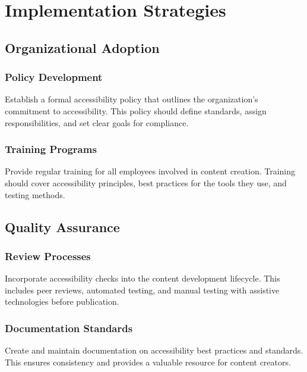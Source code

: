 \section{Implementation Strategies}\label{ch15:sec:implementation-strategies}

\subsection{Organizational Adoption}\label{ch15:ssec:org-adoption}

\subsubsection{Policy Development}\label{ch15:sssec:policy-dev}
Establish a formal accessibility policy that outlines the organization's commitment to accessibility. This policy should define standards, assign responsibilities, and set clear goals for compliance.

\subsubsection{Training Programs}\label{ch15:sssec:training-programs}
Provide regular training for all employees involved in content creation. Training should cover accessibility principles, best practices for the tools they use, and testing methods.

\subsection{Quality Assurance}\label{ch15:ssec:qa}

\subsubsection{Review Processes}\label{ch15:sssec:review-processes}
Incorporate accessibility checks into the content development lifecycle. This includes peer reviews, automated testing, and manual testing with assistive technologies before publication.

\subsubsection{Documentation Standards}\label{ch15:sssec:doc-standards}
Create and maintain documentation on accessibility best practices and standards. This ensures consistency and provides a valuable resource for content creators.

